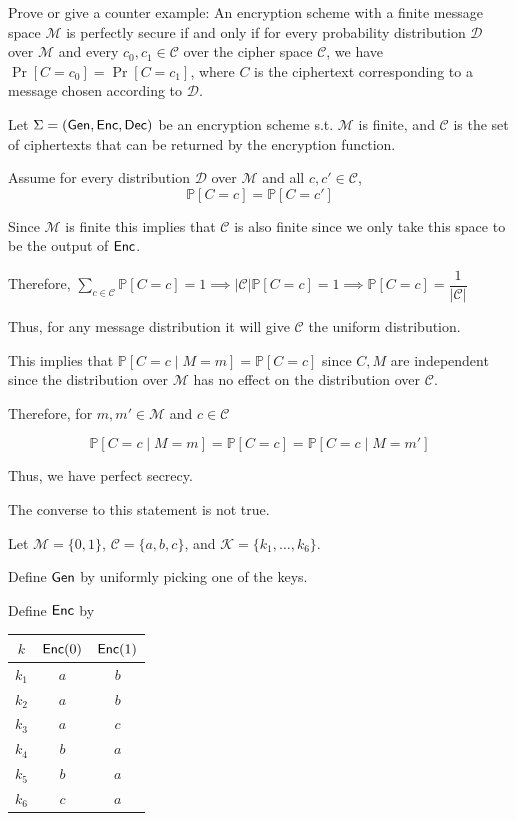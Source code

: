 \documentclass[12pt, letterpaper]{article}
\renewcommand{\P}{\mathbb{P}}
\newcommand{\skcgen}{{\sf Gen}} \newcommand{\skcenc}{{\sf Enc}}
\newcommand{\skcdec}{{\sf Dec}}
\begin{document}
\begin{problem}{}
    Prove or give a counter example: An encryption scheme with a
  finite message space $\mathcal{M}$ is perfectly secure if and only
  if for every probability distribution $\mathcal{D}$ over
  $\mathcal{M}$ and every $c_0, c_1 \in \mathcal{C}$ over the cipher
  space $\mathcal{C}$, we have $\Pr[C = c_0] = \Pr[C = c_1]$, where
  $C$ is the ciphertext corresponding to a message chosen according to
  $\mathcal{D}$.
\end{problem}
\begin{problemproof}
    Let $\Sigma=(\skcgen, \skcenc, \skcdec)$ be an encryption scheme s.t. $\mathcal{M}$ is finite, and $\mathcal{C}$ is the set of ciphertexts that can be returned by the encryption function.

    Assume for every distribution $\mathcal{D}$ over $\mathcal{M}$ and all $c,c' \in \mathcal{C}$,
    \[\P[C=c]=\P[C=c']\]
    
    Since $\mathcal{M}$ is finite this implies that $\mathcal{C}$ is also finite since we only take this space to be the output of $\skcenc$.

    Therefore, $\sum_{c \in \mathcal{C}} \P[C=c]=1 \implies |\mathcal{C}| \P[C=c] = 1 \implies \P[C=c]=\dfrac{1}{|\mathcal{C}|}$

    Thus, for any message distribution it will give $\mathcal{C}$ the uniform distribution.

    This implies that $\P[C=c \mid M=m]=\P[C=c]$ since $C,M$ are independent since the distribution over $\mathcal{M}$ has no effect on the distribution over $\mathcal{C}$.

    Therefore, for $m,m' \in \mathcal{M}$ and $c \in \mathcal{C}$

    \[\P[C=c \mid M=m] = \P[C=c] = \P[C=c \mid M=m']\]

    Thus, we have perfect secrecy.

    The converse to this statement is not true.

    Let $\mathcal{M} = \{0,1\}$, $\mathcal{C}=\{a,b,c\}$, and $\mathcal{K}=\{k_1,\dots,k_6\}$.

    Define $\skcgen$ by uniformly picking one of the keys.

    Define $\skcenc$ by
    \begin{center}
        \begin{tabular}{c|cc}
            $k$ & $\skcenc(0)$ & $\skcenc(1)$\\
            \hline
            $k_1$  & $a$ & $b$\\
            $k_2$  & $a$ & $b$\\
            $k_3$  & $a$ & $c$\\
            $k_4$  & $b$ & $a$\\
            $k_5$  & $b$ & $a$\\
            $k_6$  & $c$ & $a$\\ 
        \end{tabular}
    \end{center}


\end{problemproof}
\end{document}

